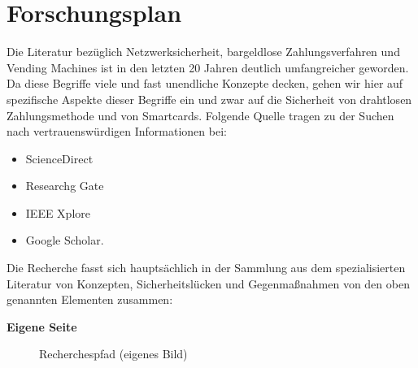 \section{Forschungsplan}

Die Literatur bezüglich Netzwerksicherheit, bargeldlose Zahlungsverfahren und Vending Machines ist 
in den letzten 20 Jahren deutlich umfangreicher geworden. Da diese Begriffe viele und fast unendliche 
Konzepte decken, gehen wir hier auf spezifische Aspekte dieser Begriffe ein und zwar 
auf die Sicherheit von drahtlosen Zahlungsmethode und von Smartcards. Folgende Quelle tragen zu der
Suchen nach vertrauenswürdigen Informationen bei:

\begin{itemize}
    \item ScienceDirect
    \item Researchg Gate
    \item IEEE Xplore
    \item Google Scholar.
\end{itemize}

Die Recherche fasst sich hauptsächlich in der Sammlung aus dem spezialisierten Literatur von Konzepten,
Sicherheitslücken und Gegenmaßnahmen von den oben genannten Elementen zusammen:

\textbf{Eigene Seite}
\vfill
\begin{figure}[htb]
    \caption{Recherchespfad (eigenes Bild)}
    \label{fig:diagramrecherche}
\end{figure}
\vfill
